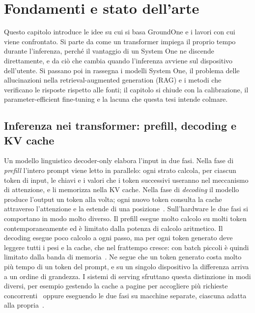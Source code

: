 \chapter{Fondamenti e stato dell'arte}
\label{sec:background}


Questo capitolo introduce le idee su cui si basa GroundOne e i lavori con cui viene confrontato. Si parte da come un
transformer impiega il proprio tempo durante l'inferenza, perché il vantaggio di un System One ne discende direttamente,
e da ciò che cambia quando l'inferenza avviene sul dispositivo dell'utente. Si passano poi in rassegna i modelli System
One, il problema delle allucinazioni nella retrieval-augmented generation (RAG) e i metodi che verificano le risposte
rispetto alle fonti; il capitolo si chiude con la calibrazione, il parameter-efficient fine-tuning e la lacuna che questa
tesi intende colmare.

\section{Inferenza nei transformer: prefill, decoding e KV cache}
\label{sec:bg-inference}

Un modello linguistico decoder-only elabora l'input in due fasi. Nella fase di \emph{prefill} l'intero prompt viene letto
in parallelo: ogni strato calcola, per ciascun token di input, le chiavi e i valori che i token successivi useranno nel
meccanismo di attenzione, e li memorizza nella KV cache. Nella fase di \emph{decoding} il modello produce l'output un
token alla volta; ogni nuovo token consulta la cache attraverso l'attenzione e la estende di una
posizione~\cite{pope2023scaling}. Sull'hardware le due fasi si comportano in modo molto diverso. Il prefill esegue molto
calcolo su molti token contemporaneamente ed è limitato dalla potenza di calcolo aritmetico. Il decoding esegue poco
calcolo a ogni passo, ma per ogni token generato deve leggere tutti i pesi e la cache, che nel frattempo cresce: con
batch piccoli è quindi limitato dalla banda di memoria~\cite{pope2023scaling,patel2024splitwise}. Ne segue che un token
generato costa molto più tempo di un token del prompt, e su un singolo dispositivo la differenza arriva a un ordine di
grandezza. I sistemi di serving sfruttano questa distinzione in modi diversi, per esempio gestendo la cache a pagine per
accogliere più richieste concorrenti~\cite{kwon2023pagedattention} oppure eseguendo le due fasi su macchine separate,
ciascuna adatta alla propria~\cite{patel2024splitwise}.

